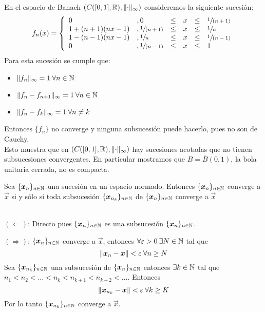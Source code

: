 \begin{ejemplo}
En el espacio de Banach $(C([0,1],\mathbb{R}),\lVert\cdot\rVert_\infty)$ consideremos la siguiente sucesi\'on:
$$ f_n(x)= \left\{ \begin{array}{llllll}
0             & ,0             & \leq & x & \leq & \sfrac{1}{(n+1)} \\
1+(n+1)(nx-1) & ,\sfrac{1}{(n+1)} & \leq & x & \leq & \sfrac{1}{n} \\
1-(n-1)(nx-1) & ,\sfrac{1}{n}   & \leq & x & \leq & \sfrac{1}{(n-1)} \\
0             & ,\sfrac{1}{(n-1)} & \leq & x & \leq & 1 \end{array} \right.$$
Para esta sucesi\'on se cumple que:
\begin{itemize}
\item $\lVert f_n\rVert_\infty =1\:\forall n\in\mathbb{N}$
\item $\lVert f_n-f_{n+1}\rVert_\infty =1\:\forall n\in\mathbb{N}$
\item $\lVert f_n-f_k\rVert_\infty =1\:\forall n\not= k$
\end{itemize}
Entonces $\{f_n\}$ no converge y ninguna subsucesi\'on puede hacerlo, pues no son de Cauchy.
\\Esto muestra que en $(C([0,1],\mathbb{R}),\lVert\cdot\rVert_\infty)$ hay sucesiones acotadas que no tienen subsucesiones convergentes. En particular mostramos que $B=\overline{B}(0,1)$, la bola unitaria cerrada, no es compacta.
\end{ejemplo}

\begin{teorema}
Sea $\{\boldsymbol{x}_n\}_{n\in\mathbb{N}}$ una sucesi\'on en un espacio normado. Entonces $\{\boldsymbol{x}_n\}_{n\in\mathbb{N}}$ converge a $\vec{x}$ si y s\'olo si toda subsucesi\'on $\{\boldsymbol{x}_{n_k}\}_{n\in\mathbb{N}}$ de $\{\boldsymbol{x}_n\}_{n\in\mathbb{N}}$ converge a $\vec{x}$
\end{teorema}

\begin{demostracion}
\textcolor{white}{linea en blanco}
\\$(\Leftarrow)$: Directo pues $\{\boldsymbol{x}_n\}_{n\in\mathbb{N}}$ es una subsucesi\'on $\{\boldsymbol{x}_n\}_{n\in\mathbb{N}}$.

\smallskip

$(\Rightarrow)$: $\{\boldsymbol{x}_n\}_{n\in\mathbb{N}}$ converge a $\vec{x}$, entonces $\forall \varepsilon > 0 \:\exists N \in \mathbb{N}$ tal que $$\lVert\boldsymbol{x}_n-\boldsymbol{x}\rVert<\varepsilon \: \forall n\geq N$$
Sea $\{\boldsymbol{x}_{n_k}\}_{n\in\mathbb{N}}$ una subsucesi\'on de $\{\boldsymbol{x}_n\}_{n\in\mathbb{N}}$ entonces $\exists k\in \mathbb{N}$ tal que $n_1<n_2<\dots <n_k<n_{k+1}<n_{k+2}<\dots$. Entonces 
$$\lVert\boldsymbol{x}_{n_k}-\boldsymbol{x}\rVert<\varepsilon\: \forall k\geq K$$ 
Por lo tanto $\{\boldsymbol{x}_{n_k}\}_{n\in\mathbb{N}}$ converge a $\vec{x}$.
\end{demostracion}

